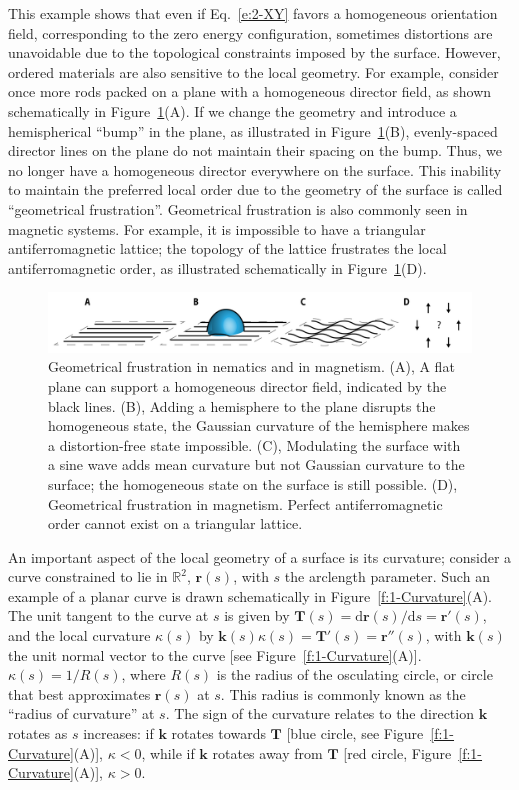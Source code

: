 This example shows that even if Eq.~\ref{e:2-XY} favors a homogeneous orientation field, corresponding to the zero energy configuration, sometimes distortions are unavoidable due to the topological constraints imposed by the surface.
However, ordered materials are also sensitive to the local geometry.
For example, consider once more rods packed on a plane with a homogeneous director field, as shown schematically in Figure~\ref{f:1-ParallelTransport}(A).
If we change the geometry and introduce a hemispherical ``bump'' in the plane, as illustrated in Figure~\ref{f:1-ParallelTransport}(B), evenly-spaced director lines on the plane do not maintain their spacing on the bump.
Thus, we no longer have a homogeneous director everywhere on the surface.
This inability to maintain the preferred local order due to the geometry of the surface is called ``geometrical frustration''.
Geometrical frustration is also commonly seen in magnetic systems.
For example, it is impossible to have a triangular antiferromagnetic lattice; the topology of the lattice frustrates the local antiferromagnetic order, as illustrated schematically in Figure~\ref{f:1-ParallelTransport}(D).
\begin{figure}
  \centering
  \includegraphics{figures/C1/Ch1-Figs_ParallelTransport.png}
  \caption{Geometrical frustration in nematics and in magnetism.
  (A), A flat plane can support a homogeneous director field, indicated by the black lines.
  (B), Adding a hemisphere to the plane disrupts the homogeneous state, the Gaussian curvature of the hemisphere makes a distortion-free state impossible.
  (C), Modulating the surface with a sine wave adds mean curvature but not Gaussian curvature to the surface; the homogeneous state on the surface is still possible.
  (D), Geometrical frustration in magnetism. Perfect antiferromagnetic order cannot exist on a triangular lattice.}\label{f:1-ParallelTransport}
\end{figure}

An important aspect of the local geometry of a surface is its curvature; consider a curve constrained to lie in $\mathbb{R}^2$, $\mathbf{r}(s)$, with $s$ the arclength parameter.
Such an example of a planar curve is drawn schematically in Figure~\ref{f:1-Curvature}(A).
The unit tangent to the curve at $s$ is given by $\mathbf{T}(s) = \textrm{d} \mathbf{r}(s)/\textrm{d}s = \mathbf{r}'(s)$, and the local curvature $\kappa(s)$ by $\mathbf{k}(s)\kappa(s) = \mathbf{T}'(s) = \mathbf{r}''(s) $, with $\mathbf{k}(s)$ the unit normal vector to the curve [see Figure~\ref{f:1-Curvature}(A)].
$\kappa(s) = 1/R(s)$, where $R(s)$ is the radius of the osculating circle, or circle that best approximates $\mathbf{r}(s)$ at $s$.
This radius is commonly known as the ``radius of curvature'' at $s$.
The sign of the curvature relates to the direction $\mathbf{k}$ rotates as $s$ increases: if $\mathbf{k}$ rotates towards $\mathbf{T}$ [blue circle, see Figure~\ref{f:1-Curvature}(A)], $\kappa < 0$, while if $\mathbf{k}$ rotates away from $\mathbf{T}$ [red circle, Figure~\ref{f:1-Curvature}(A)], $\kappa > 0$.

